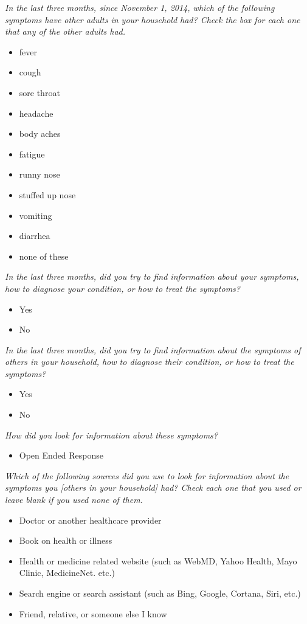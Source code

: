\documentclass[12pt]{article}
\begin{document}
\emph{In the last three months, since November 1, 2014, which of the following symptoms have other adults in your household had? Check the box for each one that any of the other adults had.}
\begin{itemize}
\item fever
\item cough
\item sore throat
\item headache
\item body aches
\item fatigue
\item runny nose
\item stuffed up nose
\item vomiting
\item diarrhea
\item none of these
\end{itemize}

\emph{In the last three months, did you try to find information about your symptoms, how to diagnose your condition, or how to treat the symptoms?}
\begin{itemize}
\item Yes
\item No
\end{itemize}

\emph{In the last three months, did you try to find information about the symptoms of others in your household, how to diagnose their condition, or how to treat the symptoms?}
\begin{itemize}
\item Yes
\item No
\end{itemize}

\emph{How did you look for information about these symptoms?}
\begin{itemize}
\item Open Ended Response
\end{itemize}

\emph{Which of the following sources did you use to look for information about the symptoms you [others in your household] had? Check each one that you used or leave blank if you used none of them.}
\begin{itemize}
\item Doctor or another healthcare provider	
\item Book on health or illness
\item Health or medicine related website (such as WebMD, Yahoo Health, Mayo Clinic, MedicineNet. etc.)
\item Search engine or search assistant (such as Bing, Google, Cortana, Siri, etc.)
\item Friend, relative, or someone else I know
\end{itemize}
 
\end{document}
